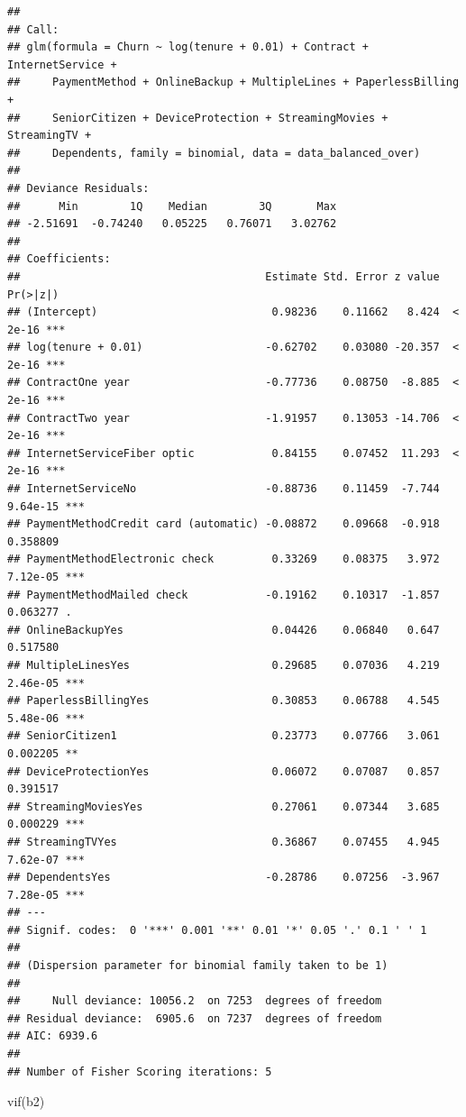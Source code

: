\documentclass[
  twoside]{article}
\newenvironment{Shaded}{\begin{snugshade}}{\end{snugshade}}
\newcommand{\FunctionTok}[1]{\textcolor[rgb]{0.00,0.00,0.00}{#1}}
\newcommand{\NormalTok}[1]{#1}
\begin{document}
\begin{verbatim}
## 
## Call:
## glm(formula = Churn ~ log(tenure + 0.01) + Contract + InternetService + 
##     PaymentMethod + OnlineBackup + MultipleLines + PaperlessBilling + 
##     SeniorCitizen + DeviceProtection + StreamingMovies + StreamingTV + 
##     Dependents, family = binomial, data = data_balanced_over)
## 
## Deviance Residuals: 
##      Min        1Q    Median        3Q       Max  
## -2.51691  -0.74240   0.05225   0.76071   3.02762  
## 
## Coefficients:
##                                      Estimate Std. Error z value Pr(>|z|)    
## (Intercept)                           0.98236    0.11662   8.424  < 2e-16 ***
## log(tenure + 0.01)                   -0.62702    0.03080 -20.357  < 2e-16 ***
## ContractOne year                     -0.77736    0.08750  -8.885  < 2e-16 ***
## ContractTwo year                     -1.91957    0.13053 -14.706  < 2e-16 ***
## InternetServiceFiber optic            0.84155    0.07452  11.293  < 2e-16 ***
## InternetServiceNo                    -0.88736    0.11459  -7.744 9.64e-15 ***
## PaymentMethodCredit card (automatic) -0.08872    0.09668  -0.918 0.358809    
## PaymentMethodElectronic check         0.33269    0.08375   3.972 7.12e-05 ***
## PaymentMethodMailed check            -0.19162    0.10317  -1.857 0.063277 .  
## OnlineBackupYes                       0.04426    0.06840   0.647 0.517580    
## MultipleLinesYes                      0.29685    0.07036   4.219 2.46e-05 ***
## PaperlessBillingYes                   0.30853    0.06788   4.545 5.48e-06 ***
## SeniorCitizen1                        0.23773    0.07766   3.061 0.002205 ** 
## DeviceProtectionYes                   0.06072    0.07087   0.857 0.391517    
## StreamingMoviesYes                    0.27061    0.07344   3.685 0.000229 ***
## StreamingTVYes                        0.36867    0.07455   4.945 7.62e-07 ***
## DependentsYes                        -0.28786    0.07256  -3.967 7.28e-05 ***
## ---
## Signif. codes:  0 '***' 0.001 '**' 0.01 '*' 0.05 '.' 0.1 ' ' 1
## 
## (Dispersion parameter for binomial family taken to be 1)
## 
##     Null deviance: 10056.2  on 7253  degrees of freedom
## Residual deviance:  6905.6  on 7237  degrees of freedom
## AIC: 6939.6
## 
## Number of Fisher Scoring iterations: 5
\end{verbatim}

\begin{Shaded}
\begin{Highlighting}[]
\FunctionTok{vif}\NormalTok{(b2)}
\end{Highlighting}
\end{Shaded}
\end{document}
